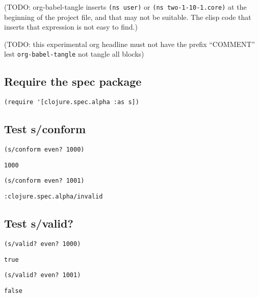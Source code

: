 \documentclass[10pt,oneside,x11names]{article}
\begin{document}
(TODO: org-babel-tangle inserts \texttt{(ns user)} or \texttt{(ns two-1-10-1.core)} at the
beginning of the project file, and that may not be suitable. The elisp code that
inserts that expression is not easy to find.)

(TODO: this experimental org headline must not have the prefix ``COMMENT'' lest
\texttt{org-babel-tangle} not tangle all blocks)

\subsection{Require the spec package}
\label{sec:org3ea1994}

\begin{verbatim}
(require '[clojure.spec.alpha :as s])
\end{verbatim}

\subsection{Test s/conform}
\label{sec:org88a6cbe}

\begin{verbatim}
(s/conform even? 1000)
\end{verbatim}

\begin{verbatim}
1000
\end{verbatim}


\begin{verbatim}
(s/conform even? 1001)
\end{verbatim}

\begin{verbatim}
:clojure.spec.alpha/invalid
\end{verbatim}

\subsection{Test s/valid?}
\label{sec:org1a0e257}

\begin{verbatim}
(s/valid? even? 1000)
\end{verbatim}

\begin{verbatim}
true
\end{verbatim}


\begin{verbatim}
(s/valid? even? 1001)
\end{verbatim}

\begin{verbatim}
false
\end{verbatim}
\end{document}
